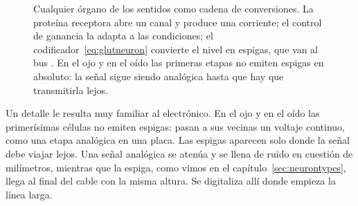 \begin{figure}[t]
\centering
{}
\caption{Cualquier órgano de los sentidos como cadena de conversiones. La proteína receptora abre un canal y produce una corriente; el control de ganancia la adapta a las condiciones; el codificador~\eqref{eq:glutneuron} convierte el nivel en espigas, que van al bus . En el ojo y en el oído las primeras etapas no emiten espigas en absoluto: la señal sigue siendo analógica hasta que hay que transmitirla lejos.}
\label{fig:transducer}
\end{figure}

Un detalle le resulta muy familiar al electrónico. En el ojo y en el oído las primerísimas células no emiten espigas: pasan a sus vecinas un voltaje continuo, como una etapa analógica en una placa. Las espigas aparecen solo donde la señal debe viajar lejos. Una señal analógica se atenúa y se llena de ruido en cuestión de milímetros, mientras que la espiga, como vimos en el capítulo~\ref{sec:neurontypes}, llega al final del cable con la misma altura. Se digitaliza allí donde empieza la línea larga.

